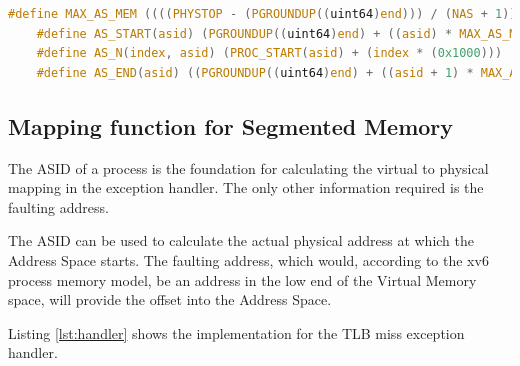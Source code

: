 \begin{lstlisting}[language=c,float=h!,
    label={lst:macros}]
    #define MAX_AS_MEM ((((PHYSTOP - (PGROUNDUP((uint64)end))) / (NAS + 1)) >> 12 )<< 12)
    #define AS_START(asid) (PGROUNDUP((uint64)end) + ((asid) * MAX_AS_MEM))
    #define AS_N(index, asid) (PROC_START(asid) + (index * (0x1000)))
    #define AS_END(asid) ((PGROUNDUP((uint64)end) + ((asid + 1) * MAX_AS_MEM))-0x1000)
\end{lstlisting}

\subsection{Mapping function for Segmented Memory}
The ASID of a process is the foundation for calculating the virtual to physical mapping in the exception handler.
The only other information required is the faulting address.

The ASID can be used to calculate the actual physical address at which the Address Space starts.
The faulting address, which would, according to the xv6 process memory model, be an address in the low
end of the Virtual Memory space, will provide the offset into the Address Space.

Listing \ref{lst:handler} shows the implementation for the TLB miss exception handler.

